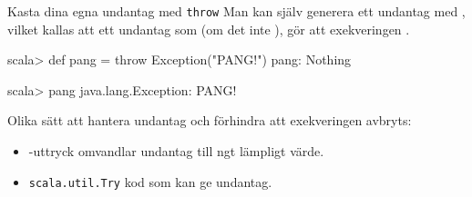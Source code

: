 \begin{Slide}{Kasta dina egna undantag med \texttt{throw}}\SlideFontSmall
Man kan själv generera ett undantag med , vilket kallas att  ett undantag som (om det inte ), gör att exekveringen .


\begin{REPL}
scala> def pang = throw Exception("PANG!")
pang: Nothing

scala> pang
java.lang.Exception: PANG!

\end{REPL}
\pause
Olika sätt att hantera undantag och förhindra att exekveringen avbryts:
\begin{itemize}
\item {}-uttryck omvandlar undantag till ngt lämpligt värde.

\item \texttt{scala.util.Try}  kod som kan ge undantag.  %
\end{itemize}
\end{Slide}



